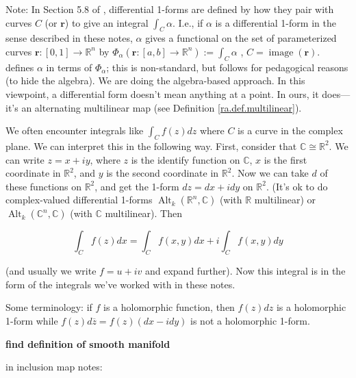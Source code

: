 Note: In Section 5.8 of \citet{pugh2015real}, differential 1-forms are defined by how they pair with curves \(C\) (or \(\boldsymbol{r}\)) to give an integral \(\int_C \alpha\). I.e., if \(\alpha\) is a differential 1-form in the sense described in these notes, \(\alpha\) gives a functional on the set of parameterized curves \(\boldsymbol{r}: [0,1] \to \mathbb{R}^n\) by \(\Phi_\alpha(\boldsymbol{r}: [a,b] \to \mathbb{R}^n) := \int_C \alpha\) , \(C = \operatorname{image}(\boldsymbol{r})\). \citet{pugh2015real} defines \(\alpha\) in terms of \(\Phi_\alpha\); this is non-standard, but follows \citet{rudin1976principles} for pedagogical reasons (to hide the algebra). We are doing the algebra-based approach. In this viewpoint, a differential form doesn't mean anything at a point. In ours, it does---it's an alternating multilinear map (see Definition \ref{ra.def.multilinear}).

\begin{example}

We often encounter integrals like \(\int_C f(z) dz\) where \(C\) is a curve in the complex plane. We can interpret this in the following way. First, consider that \(\mathbb{C} \cong \mathbb{R}^2\). We can write \(z = x + iy\), where \(z\) is the identify function on \(\mathbb{C}\), \(x\) is the first coordinate in \(\mathbb{R}^2\), and \(y\) is the second coordinate in \(\mathbb{R}^2\). Now we can take \(d\) of these functions on \(\mathbb{R}^2\), and get the 1-form \(dz = dx + i dy\) on \(\mathbb{R}^2\). (It's ok to do complex-valued differential 1-forms \(\operatorname{Alt}_k(\mathbb{R}^n, \mathbb{C})\) (with \(\mathbb{R}\) multilinear) or \(\operatorname{Alt}_k(\mathbb{C}^n, \mathbb{C})\) (with \(\mathbb{C}\) multilinear). Then

\[
\int_C f(z) dx = \int_C f(x,y) dx + i \int_C f(x,y) dy
\]

 (and usually we write \(f = u + iv\) and expand further). Now this integral is in the form of the integrals we've worked with in these notes. 
 
 Some terminology: if \(f\) is a holomorphic function, then \(f(z) dz\) is a holomorphic 1-form while \(f(z) d \overline{z} = f(z)(dx - idy)\) is not a holomorphic 1-form.

\end{example}

\textbf{find definition of smooth manifold}

in inclusion map notes: 


